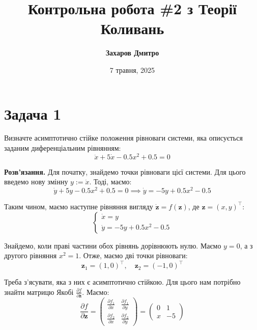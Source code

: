\documentclass{hw_template}
\title{\bfseries Контрольна робота \#2 з Теорії Коливань}
\author{\bfseries Захаров Дмитро}
\date{7 травня, 2025}
\begin{document}
\pagestyle{fancy}

\maketitle

\section{Задача 1}

\begin{problem}
    Визначте асимптотично стійке положення рівноваги системи, яка 
    описується заданим диференціальним рівнянням:
    \begin{equation*}
        \ddot{x} + 5\dot{x} - 0.5x^2 + 0.5 = 0
    \end{equation*}
\end{problem}

\textbf{Розв'язання.} Для початку, знайдемо точки рівноваги цієї системи. Для 
цього введемо нову змінну $y := \dot{x}$. Тоді, маємо:
\begin{equation*}
    \dot{y} + 5y - 0.5x^2 + 0.5 = 0 \implies \dot{y} = -5y + 0.5x^2 - 0.5
\end{equation*}

Таким чином, маємо наступне рівняння вигляду $\dot{\mathbf{z}} = f(\mathbf{z})$, 
де $\mathbf{z} = (x,y)^{\top}$:
\begin{equation*}
    \begin{cases}
        \dot{x} = y \\
        \dot{y} = -5y + 0.5x^2 - 0.5
    \end{cases}
\end{equation*}

Знайдемо, коли праві частини обох рівнянь дорівнюють нулю. Маємо $y=0$, 
а з другого рівняння $x^2=1$. Отже, маємо дві точки рівноваги:
\begin{equation*}
    \mathbf{z}_1 = (1,0)^{\top}, \quad \mathbf{z}_2 = (-1,0)^{\top}
\end{equation*}

Треба з'ясувати, яка з них є асимптотично стійкою. Для цього нам потрібно 
знайти матрицю Якобі $\frac{\partial f}{\partial \mathbf{z}}$. Маємо:
\begin{equation*}
    \frac{\partial f}{\partial \mathbf{z}} = 
    \begin{pmatrix}
        \frac{\partial f_1}{\partial x} & \frac{\partial f_1}{\partial y} \\
        \frac{\partial f_2}{\partial x} & \frac{\partial f_2}{\partial y}   
    \end{pmatrix}
    =
    \begin{pmatrix}
        0 & 1 \\
        x & -5
    \end{pmatrix}
\end{equation*}
\end{document}
